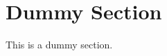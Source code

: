 \documentclass[journal]{IEEEtran}
\def\supplementfilename{supp.pdf}
\def\numbersupplementpages{\the\pdflastximagepages}
\newif\ifarXiv
\begin{document}
\section{Dummy Section}

This is a dummy section.

\printbibliography

\clearpage

\ifarXiv
    \foreach \x in {1,...,\numbersupplementpages}
    {
        
    }
\fi
\end{document}
